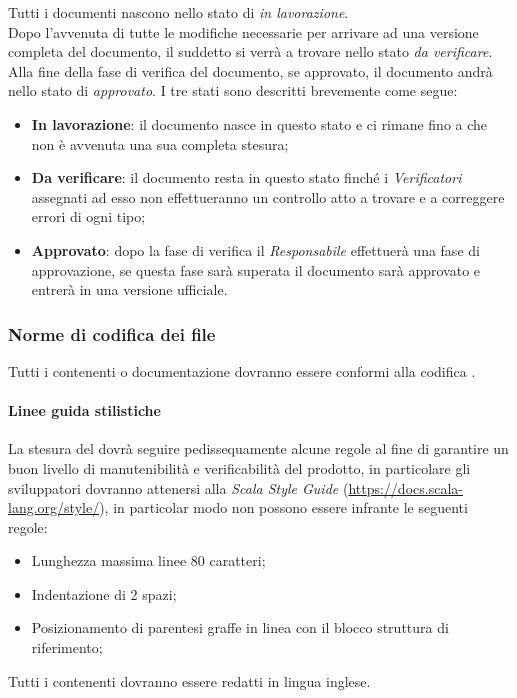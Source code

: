\documentclass{scalatekids-article}
\begin{document}
Tutti i documenti nascono nello stato di \textit{in lavorazione}.\\
Dopo l'avvenuta di tutte le modifiche necessarie per arrivare ad una versione completa del documento, il suddetto si verrà a trovare nello stato \textit{da verificare}.\\
Alla fine della fase di verifica del documento, se approvato, il documento andrà nello stato di \textit{approvato}.
I tre stati sono descritti brevemente come segue:
\begin{itemize}
    \item \textbf{In lavorazione}: il documento nasce in questo stato e ci rimane fino a che non è avvenuta una sua completa stesura;
    \item \textbf{Da verificare}: il documento resta in questo stato finché i \textit{Verificatori} assegnati ad esso non effettueranno un controllo atto a trovare e a correggere errori di ogni tipo;
    \item \textbf{Approvato}: dopo la fase di verifica il \textit{Responsabile} effettuerà una fase di approvazione, se questa fase sarà superata il documento sarà approvato e entrerà in una versione ufficiale.
\end{itemize}

\subsubsection{Norme di codifica dei file}

Tutti i  contenenti  o documentazione dovranno essere conformi alla
codifica .

\paragraph{Linee guida stilistiche}

La stesura del  dovrà seguire pedissequamente alcune regole al fine di
garantire un buon livello di manutenibilità e verificabilità del prodotto, in
particolare gli sviluppatori dovranno attenersi alla \textit{Scala Style Guide}
(\url{https://docs.scala-lang.org/style/}), in particolar modo non possono
essere infrante le seguenti regole:
\begin{itemize}
    \item Lunghezza massima linee 80 caratteri;
    \item Indentazione di 2 spazi;
    \item Posizionamento di parentesi graffe in linea con il blocco struttura di
        riferimento;
\end{itemize}
Tutti i  contenenti  dovranno essere redatti in lingua inglese.
\end{document}
